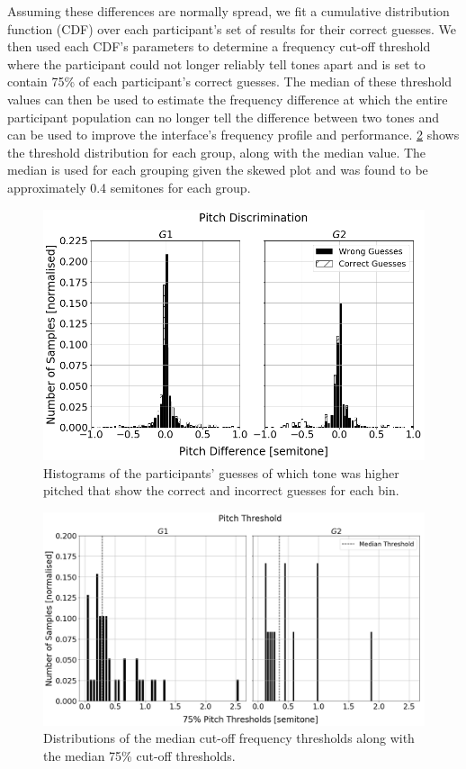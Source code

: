 \documentclass[]{interact}
\begin{document}
Assuming these differences are normally spread, we fit a cumulative distribution function (CDF) over each participant's set of results for their correct guesses.
We then used each CDF's parameters to determine a frequency cut-off threshold where the participant could not longer reliably tell tones apart and is set to contain 75\% of each participant's correct guesses.
The median of these threshold values can then be used to estimate the frequency difference at which the entire participant population can no longer tell the difference between two tones and can be used to improve the interface's frequency profile and performance. 
\cref{fig:pitch-thresholds} shows the threshold distribution for each group, along with the median value. 
The median is used for each grouping given the skewed plot and was found to be approximately 0.4 semitones for each group.

\begin{figure}
  \centering
  \includegraphics[width=1.0\textwidth]{figures/pitch_discrimination.png}
  \caption{Histograms of the participants' guesses of which tone was higher pitched that show the correct and incorrect guesses for each bin. }\label{fig:pitch-discrimination}
\end{figure}

\begin{figure}
  \centering
  \includegraphics[width=1.0\textwidth]{figures/pitch_thresholds.png}
  \caption{Distributions of the median cut-off frequency thresholds along with the median 75\% cut-off thresholds. }\label{fig:pitch-thresholds}
\end{figure}
\end{document}
